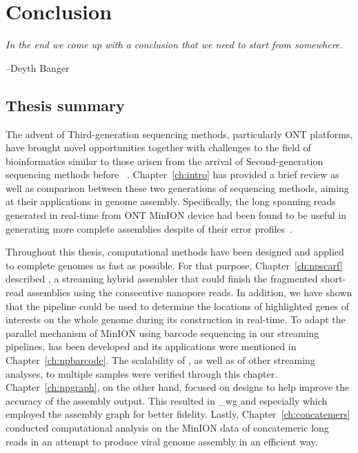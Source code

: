 \chapter{Conclusion}\label{ch:conclusion}
\thispagestyle{empty}
\vspace*{\fill}
\epigraph{\emph{In the end we come up with a conclusion that we need to start from somewhere.}}
{--Deyth Banger}

\clearpage

\section{Thesis summary}
The advent of Third-generation sequencing methods, particularly ONT platforms, have brought novel opportunities together with challenges to the field of bioinformatics similar to those arisen from the arrival of Second-generation sequencing methods before ~\cite{SchadtTK2010,ThkurRB2012}.
Chapter~\ref{ch:intro} has provided a brief review as well as comparison between these two generations of sequencing methods, aiming at their applications in genome assembly.
Specifically, the long spanning reads generated in real-time from ONT MinION device had been found to be useful in generating more complete assemblies despite of their error profiles~\cite{GoodwinGE2015,MadouiEC2015,Karlsson2015}. 

Throughout this thesis, computational methods have been designed and applied to complete genomes as fast as possible.  
For that purpose, Chapter~\ref{ch:npscarf} described \npscarf{}, a streaming hybrid assembler that could finish the fragmented short-read assemblies using the consecutive nanopore reads. In addition, we have shown that the pipeline could be used to determine the locations of highlighted genes of interests on the whole genome during its construction in real-time.
To adapt the parallel mechanism of MinION using barcode sequencing in our streaming pipelines, \npbarcode{} has been developed and its applications were mentioned in Chapter~\ref{ch:npbarcode}. The scalability of \npscarf{}, as well as of other streaming analyses, to multiple samples were verified through this chapter.
Chapter~\ref{ch:npgraph}, on the other hand, focused on designs to help improve the accuracy of the assembly output. This resulted in \npscarf{}\_wg and especially \npgraph{} which employed the assembly graph for better fidelity.
Lastly, Chapter~\ref{ch:concatemers} conducted computational analysis on the MinION data of concatemeric long reads in an attempt to produce viral genome assembly in an efficient way.

